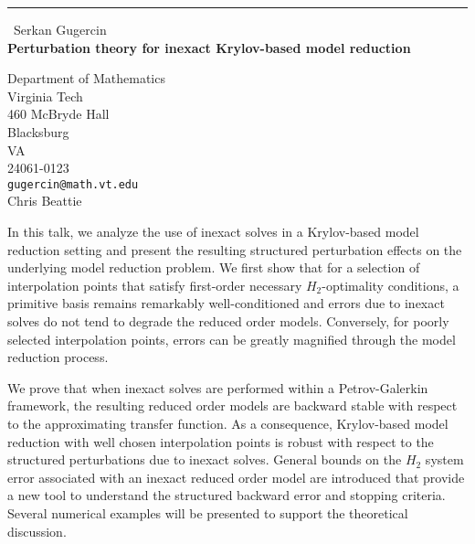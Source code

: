 \documentclass{report}
\begin{document}
\begin{center}
\rule{6in}{1pt} \
{\large Serkan Gugercin \\
{\bf Perturbation theory for inexact Krylov-based model reduction}}

Department of Mathematics \\ Virginia Tech \\ 460 McBryde Hall \\ Blacksburg \\ VA \\ 24061-0123
\\
{\tt gugercin@math.vt.edu}\\
Chris Beattie\end{center}


In this talk, we analyze the use of inexact solves in a Krylov-based
model reduction setting and present the resulting structured perturbation
effects on the underlying model reduction problem. We first show that for
a selection of interpolation points that satisfy first-order necessary
$H_{2}$-optimality conditions, a primitive basis remains remarkably
well-conditioned and errors due to inexact solves do not tend to degrade
the reduced order models. Conversely, for poorly selected interpolation
points, errors can be greatly magnified through the model reduction
process.


We prove that when inexact solves are performed within a Petrov-Galerkin
framework, the resulting reduced order models are backward stable with
respect to the approximating transfer function. As a consequence,
Krylov-based model reduction with well chosen interpolation points is
robust with respect to the structured perturbations due to inexact
solves. General bounds on the $H_{2}$ system error associated with an
inexact reduced order model are introduced that provide a new tool to
understand the structured backward error and stopping criteria. Several
numerical examples will be presented to support the theoretical
discussion.
\end{document}
